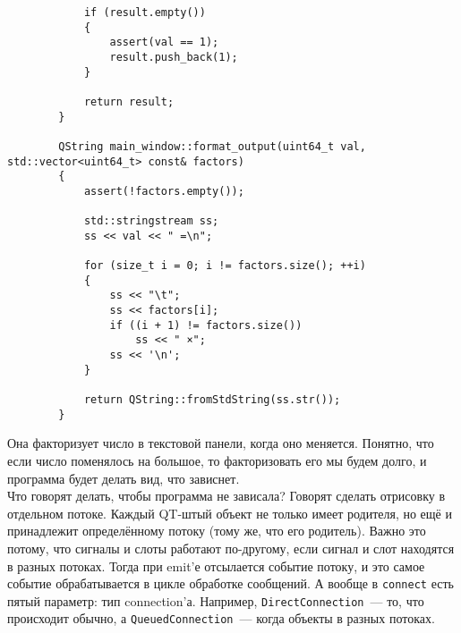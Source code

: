 \documentclass{article}
\begin{document}
\begin{verbatim}
            if (result.empty())
            {
                assert(val == 1);
                result.push_back(1);
            }
            
            return result;
        }
        
        QString main_window::format_output(uint64_t val, std::vector<uint64_t> const& factors)
        {
            assert(!factors.empty());
            
            std::stringstream ss;
            ss << val << " =\n";
            
            for (size_t i = 0; i != factors.size(); ++i)
            {
                ss << "\t";
                ss << factors[i];
                if ((i + 1) != factors.size())
                    ss << " ×";
                ss << '\n';
            }
            
            return QString::fromStdString(ss.str());
        }
    \end{verbatim}
    Она факторизует число в текстовой панели, когда оно меняется. Понятно, что если число поменялось на большое, то факторизовать его мы будем долго, и программа будет делать вид, что зависнет.\\
    Что говорят делать, чтобы программа не зависала? Говорят сделать отрисовку в отдельном потоке. Каждый QT-штый объект не только имеет родителя, но ещё и принадлежит определённому потоку (тому же, что его родитель). Важно это потому, что сигналы и слоты работают по-другому, если сигнал и слот находятся в разных потоках. Тогда при emit'е отсылается событие потоку, и это самое событие обрабатывается в цикле обработке сообщений. А вообще в \texttt{connect} есть пятый параметр: тип connection'а. Например, \texttt{DirectConnection}~--- то, что происходит обычно, а \texttt{QueuedConnection}~--- когда объекты в разных потоках.
\end{document}
